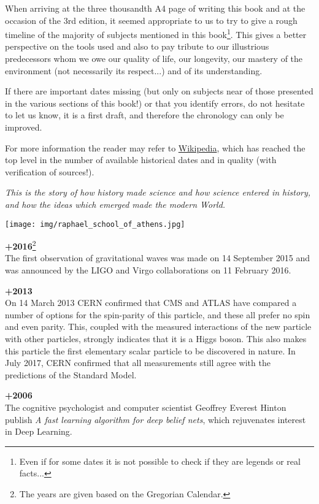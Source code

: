 When arriving at the three thousandth A4 page of writing this book and at the occasion of the 3rd edition, it seemed appropriate to us to try to give a rough timeline of the majority of subjects mentioned in this book\footnote{Even if for some dates it is not possible to check if they are legends or real facts...}. This gives a better perspective on the tools used and also to pay tribute to our illustrious predecessors whom we owe our quality of life, our longevity, our mastery of the environment (not necessarily its respect...) and of its understanding.

If there are important dates missing (but only on subjects near of those presented in the various sections of this book!) or that you identify errors, do not hesitate to let us know, it is a first draft, and therefore the chronology can only be improved.

For more information the reader may refer to \href{http://www.wikipedia.com}{{\color{blue} Wikipedia}}, which has reached the top level in the number of available historical dates and in quality (with verification of sources!).

\begin{center}
\textit{This is the story of how history made science and how science entered in history, and how the ideas which emerged made the modern World.}
\end{center}

\texttt{[image: img/raphael\_school\_of\_athens.jpg]}

\textbf{+2016}\footnote{The years are given based on the Gregorian Calendar.}\\
The first observation of gravitational waves was made on 14 September 2015 and was announced by the LIGO and Virgo collaborations on 11 February 2016.

\textbf{+2013}\\
On 14 March 2013 CERN confirmed that CMS and ATLAS have compared a number of options for the spin-parity of this particle, and these all prefer no spin and even parity. This, coupled with the measured interactions of the new particle with other particles, strongly indicates that it is a Higgs boson. This also makes this particle the first elementary scalar particle to be discovered in nature. In July 2017, CERN confirmed that all measurements still agree with the predictions of the Standard Model.

\textbf{+2006}\\
The  cognitive psychologist and computer scientist Geoffrey Everest Hinton publish \textit{A fast learning algorithm for deep belief nets}, which rejuvenates interest in Deep Learning. 

